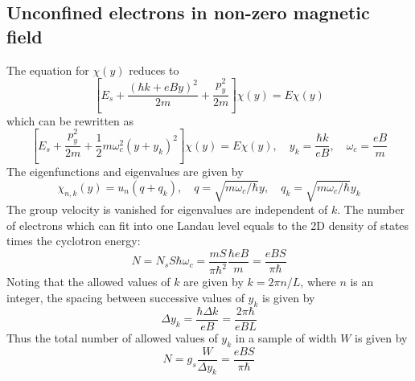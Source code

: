 \documentclass[11pt,a4paper]{book}
\theoremstyle{plain}
\theoremstyle{definition}
\theoremstyle{remark}
\begin{document}
\subsection{Unconfined electrons in non-zero magnetic field}
The equation for $\chi(y)$ reduces to
\begin{equation}
    \left[E_s + \frac{(\hbar k + e B y)^2}{2 m} + \frac{p_y^2}{2 m}\right] \chi(y) = E \chi(y)
\end{equation}
which can be rewritten as
\begin{equation}
    \left[E_s + \frac{p_y^2}{2 m} + \frac{1}{2} m \omega_c^2 (y + y_k)^2\right] \chi(y) = E \chi(y), \quad y_k = \frac{\hbar k}{e B}, \quad \omega_c = \frac{eB}{m}
\end{equation}
The eigenfunctions and eigenvalues are given by
\begin{equation}
    \chi_{n,k}(y) = u_n(q+q_k), \quad q = \sqrt{m\omega_c/\hbar} y, \quad q_k = \sqrt{m\omega_c/\hbar} y_k
\end{equation}
The group velocity is vanished for eigenvalues are independent of $k$. The number of electrons which can fit into one Landau level equals to the 2D density of states times the cyclotron energy:
\begin{equation}
    N = N_s S \hbar \omega_c = \frac{m S}{\pi \hbar^2} \frac{\hbar e B}{m} = \frac{e B S}{\pi \hbar}
\end{equation}
Noting that the allowed values of $k$ are given by $k = 2 \pi n / L$, where $n$ is an integer, the spacing between successive values of $y_k$ is given by
\begin{equation}
    \Delta y_k = \frac{\hbar \Delta k}{e B} = \frac{2 \pi \hbar}{e B L}
\end{equation}
Thus the total number of allowed values of $y_k$ in a sample of width $W$ is given by
\begin{equation}
    N = g_s \frac{W}{\Delta y_k} = \frac{e B S}{\pi \hbar}
\end{equation}
\end{document}
